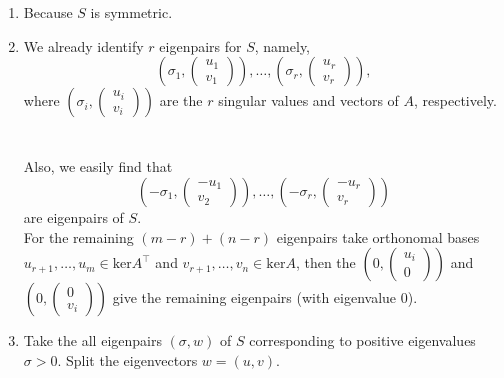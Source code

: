 {\color{solution}
\begin{enumerate}
    \item Because $S$ is symmetric.
    \item 
We already identify $r$ eigenpairs for $S$, namely, 
$$(\sigma_1,\begin{pmatrix}
u_1\\ v_1
\end{pmatrix}), \ldots, (\sigma_r,\begin{pmatrix}
u_r\\ v_r
\end{pmatrix}),$$ where $(\sigma_i,\begin{pmatrix}
u_i\\ v_i
\end{pmatrix})$ are the $r$ singular values and vectors of $A$, respectively.
~\\~\\
Also, we easily find that 
$$(-\sigma_1,\begin{pmatrix}
-u_1\\ v_2
\end{pmatrix}), \ldots, (-\sigma_r,\begin{pmatrix}
-u_r\\ v_r
\end{pmatrix})$$
 are eigenpairs of $S$.\\ 
 For the remaining $(m-r)+(n-r)$ eigenpairs take orthonomal bases $u_{r+1},\ldots, u_m\in\text{ker}A^\top$ and $v_{r+1},\ldots, v_n\in\text{ker}A$, then the $(0,\begin{pmatrix}
	u_i\\ 0
\end{pmatrix})$ and $(0,\begin{pmatrix}
0\\ v_i
\end{pmatrix})$ give the remaining eigenpairs (with eigenvalue $0$).
\item Take the all eigenpairs $(\sigma, w)$ of $S$ corresponding to positive eigenvalues $\sigma >0 $. Split the eigenvectors $w =(u,v)$.
\end{enumerate}
}
